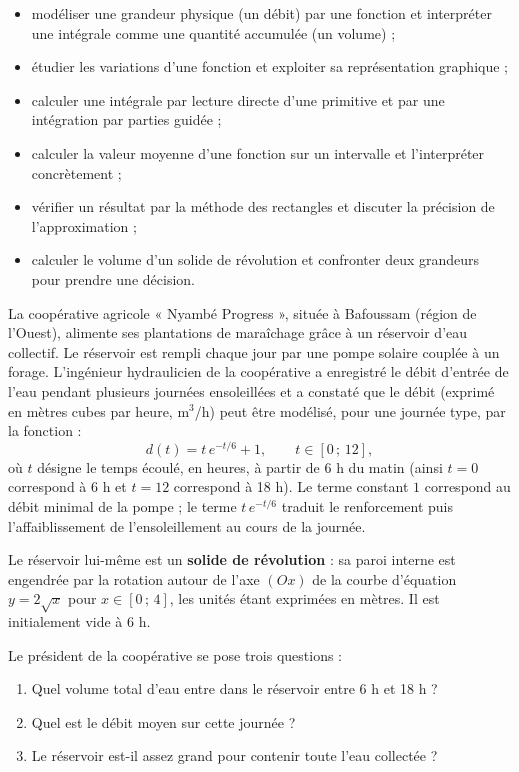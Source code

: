 \documentclass[11pt]{article}
\newcommand{\cle}[1]{{\popxbold\color{popdark}#1}}
\newcounter{popsec}
\newcounter{popsub}
\newcommand{\courssub}[1]{%
  \stepcounter{popsub}%
  \par\vspace{9pt}\noindent{\popxbold\fontsize{11.5}{13}\selectfont\color{popink}{\color{poporange}\thepopsec.\thepopsub}\hspace{6pt}#1}\par\nopagebreak\vspace{4pt}
}
\begin{document}
\begin{itemize}
\item modéliser une grandeur physique (un débit) par une fonction et interpréter une intégrale comme une quantité accumulée (un volume) ;
\item étudier les variations d'une fonction et exploiter sa représentation graphique ;
\item calculer une intégrale par \cle{lecture directe d'une primitive} et par une \cle{intégration par parties} guidée ;
\item calculer la \cle{valeur moyenne} d'une fonction sur un intervalle et l'interpréter concrètement ;
\item vérifier un résultat par la \cle{méthode des rectangles} et discuter la précision de l'approximation ;
\item calculer le \cle{volume d'un solide de révolution} et confronter deux grandeurs pour prendre une décision.
\end{itemize}

\courssub{Situation}

La coopérative agricole « Nyambé Progress », située à Bafoussam (région de l'Ouest), alimente ses plantations de maraîchage grâce à un réservoir d'eau collectif. Le réservoir est rempli chaque jour par une pompe solaire couplée à un forage. L'ingénieur hydraulicien de la coopérative a enregistré le débit d'entrée de l'eau pendant plusieurs journées ensoleillées et a constaté que le débit (exprimé en mètres cubes par heure, m$^3$/h) peut être modélisé, pour une journée type, par la fonction :
\[ d(t) = t\,e^{-t/6} + 1, \qquad t \in [0\,;\,12], \]
où $t$ désigne le temps écoulé, en heures, à partir de 6 h du matin (ainsi $t = 0$ correspond à 6 h et $t = 12$ correspond à 18 h). Le terme constant $1$ correspond au débit minimal de la pompe ; le terme $t\,e^{-t/6}$ traduit le renforcement puis l'affaiblissement de l'ensoleillement au cours de la journée.

Le réservoir lui-même est un \textbf{solide de révolution} : sa paroi interne est engendrée par la rotation autour de l'axe $(Ox)$ de la courbe d'équation $y = 2\sqrt{x}$ pour $x \in [0\,;\,4]$, les unités étant exprimées en mètres. Il est initialement vide à 6 h.

Le président de la coopérative se pose trois questions :
\begin{enumerate}
\item Quel volume total d'eau entre dans le réservoir entre 6 h et 18 h ?
\item Quel est le débit moyen sur cette journée ?
\item Le réservoir est-il assez grand pour contenir toute l'eau collectée ?
\end{enumerate}
\end{document}
